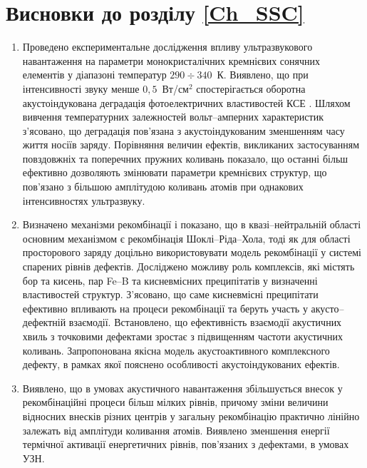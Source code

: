 \section*{Висновки до розділу \ref{Ch_SSC}}
  \begin{enumerate}[leftmargin=0cm,itemindent=3em]
     \item Проведено експериментальне дослідження впливу ультразвукового навантаження на параметри монокристалічних кремнієвих сонячних елементів
     у діапазоні температур $290\div340$~К.
     Виявлено, що при інтенсивності звуку менше $0,5$~Вт/см$^2$ спостерігається оборотна акустоіндукована деградація фотоелектричних властивостей КСЕ .
     Шляхом вивчення температурних залежностей вольт--амперних характеристик з'ясовано, що  деградація  пов'язана з акустоіндукованим зменшенням часу життя носіїв заряду.
     Порівняння величин ефектів, викликаних застосуванням повздовжніх та поперечних пружних коливань показало, що останні більш ефективно дозволяють змінювати параметри кремнієвих структур, що пов'язано з більшою амплітудою коливань атомів при однакових інтенсивностях ультразвуку.


     \item Визначено механізми рекомбінації і показано, що в квазі--нейтральній області основним механізмом є рекомбінація Шоклі--Ріда--Хола,
     тоді як для області просторового заряду доцільно використовувати модель рекомбінації у системі спарених рівнів дефектів.
     Досліджено можливу роль комплексів, які містять бор та кисень, пар Fe--B та кисневмісних преципітатів у визначенні властивостей структур.
З'ясовано, що саме кисневмісні преципітати ефективно впливають на процеси рекомбінації та беруть участь у акусто--дефектній взаємодії.
     Встановлено, що ефективність взаємодії акустичних хвиль з точковими дефектами зростає з підвищенням частоти акустичних коливань.
Запропонована якісна модель акустоактивного комплексного дефекту, в рамках якої пояснено особливості акустоіндукованих ефектів.


     \item Виявлено, що в умовах акустичного навантаження збільшується внесок у рекомбінаційні процеси більш мілких рівнів, причому зміни величини відносних внесків різних центрів у загальну рекомбінацію практично лінійно залежать від амплітуди коливання атомів.
         Виявлено зменшення енергії термічної активації енергетичних рівнів, пов'язаних з дефектами, в умовах УЗН.


\end{enumerate}

